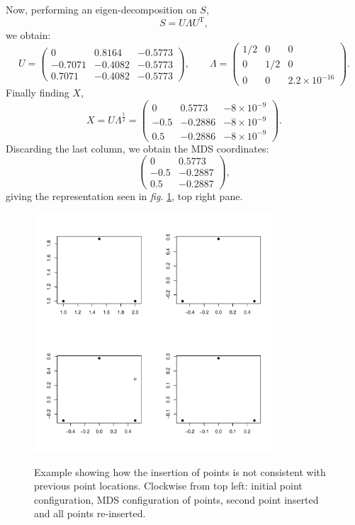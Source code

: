 \documentclass[a4paper,10pt]{article}
\newcommand{\fig}[1]{\emph{fig.} \ref{#1}}
\newcommand{\cross}{\times}
\begin{document}
Now, performing an eigen-decomposition on $S$,
\begin{equation*}
S = U \Lambda U^\text{T},
\end{equation*}
we obtain:
\begin{equation*}
U = \begin{pmatrix} 
	0 & 0.8164 & -0.5773\\
	-0.7071 & -0.4082 & -0.5773\\ 
	0.7071 & -0.4082 & -0.5773
	\end{pmatrix},\qquad
\Lambda = \begin{pmatrix} 
	1/2 & 0 & 0\\
	0 & 1/2 & 0\\ 
	0 & 0 & 2.2\cross10^{-16}
\end{pmatrix}.
\end{equation*}
Finally finding $X$,
\begin{equation*}
X=U\Lambda^{\frac{1}{2}}= \begin{pmatrix} 
	0 & 0.5773 & -8\cross10^{-9}\\
	-0.5 & -0.2886 & -8\cross10^{-9}\\ 
	0.5 & -0.2886 & -8\cross10^{-9}
	\end{pmatrix}.
\end{equation*}
Discarding the last column, we obtain the MDS coordinates:
\begin{equation}
\begin{pmatrix} 
	0 & 0.5773\\
	-0.5 & -0.2887\\ 
	0.5 & -0.2887
	\end{pmatrix},
\label{origMDScoords}
\end{equation}
giving the representation seen in \fig{cexample}, top right pane.

\begin{figure}
\centering
\includegraphics[width=3.5in]{figs/cexample-fig.pdf} \\
\caption{Example showing how the insertion of points is not consistent with previous point locations. Clockwise from top left: initial point configuration, MDS configuration of points, second point inserted and all points re-inserted.}
\label{cexample}
\end{figure}
\end{document}
